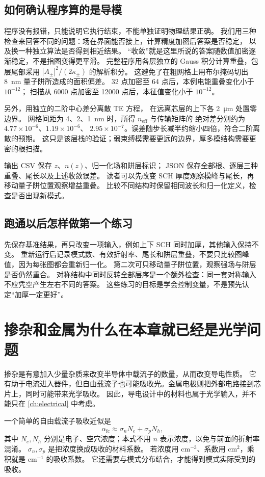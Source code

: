 \subsection{如何确认程序算的是导模}
程序没有报错，只能说明它执行结束，不能单独证明物理结果正确。
我们用三种检查来回答不同的问题：场在界面能否接上，计算精度加密后答案是否稳定，
以及换一种独立算法是否得到相近结果。
“收敛”就是这里所说的答案随数值加密逐渐稳定，不是指图变得更平滑。
完整程序用各层独立的 Gauss 积分计算重叠，包层尾部采用
$|A_\pm|^2/(2\kappa_\pm)$ 的解析积分。
这避免了在粗网格上用布尔掩码切出 \SI{8}{nm} 量子阱所造成的面积偏差。
32 点加密至 64 点后，本例电能重叠变化小于 $10^{-12}$；
扫描从 6000 点加密至 12000 点后，本征值变化小于 $10^{-12}$。

另外，用独立的二阶中心差分离散 TE 方程，
在远离芯层的上下各 \SI{2}{\micro\meter} 处置零边界。
网格间距为 4、2、\SI{1}{nm} 时，所得 $n_{\mathrm{eff}}$ 与传输矩阵的
绝对差分别约为 $4.77\times10^{-6}$、$1.19\times10^{-6}$、
$2.95\times10^{-7}$。误差随步长减半约缩小四倍，符合二阶离散的预期。
这只是该层栈的验证；弱束缚模需要更远的边界，厚多模结构需要更密的根扫描。

输出 CSV 保存 $z$、$n(z)$、归一化场和阱层标识；
JSON 保存全部根、逐层三种重叠、尾长以及上述收敛误差。
读者可以先改变 SCH 厚度观察模峰与尾长，再移动量子阱位置观察增益重叠。
比较不同结构时保留相同波长和归一化定义，检查是否出现新模式。

\subsection{跑通以后怎样做第一个练习}
先保存基准结果，再只改变一项输入，例如上下 SCH 同时加厚，其他输入保持不变。
重新运行后记录模式数、有效折射率、尾长和阱层重叠，不要只比较图峰值，因为每张图都会重新归一化。
第二次可只移动量子阱位置，观察强场与阱层是否仍然重合。
对称结构中同时反转全部层序是一个额外检查：同一套对称输入不应凭空产生左右不同的答案。
这些练习的目标是学会控制变量，不是预先认定“加厚一定更好”。

\section{掺杂和金属为什么在本章就已经是光学问题}
掺杂是有意加入少量杂质来改变半导体中载流子的数量，从而改变导电性质。
它有助于电流进入器件，但自由载流子也可能吸收光。金属电极则把外部电路接到芯片上，同时可能带来光学吸收。
因此，导电设计中的材料也属于光学输入，并不能只在 \cref{ch:electrical} 中考虑。

一个简单的自由载流子吸收近似是
\begin{equation}
\alpha_{\mathrm{fc}} \approx \sigma_n N_e + \sigma_p N_h,
\label{eq:fca_simple}
\end{equation}
其中 $N_e,N_h$ 分别是电子、空穴浓度；本式不用 $n$ 表示浓度，以免与前面的折射率混淆。
$\sigma_n,\sigma_p$ 是把浓度换成吸收的材料系数。
若浓度用 $\mathrm{cm}^{-3}$、系数用 $\mathrm{cm}^2$，乘积就是 $\mathrm{cm}^{-1}$ 的吸收系数。
它还需要与模式分布结合，才能得到模式实际受到的吸收。

